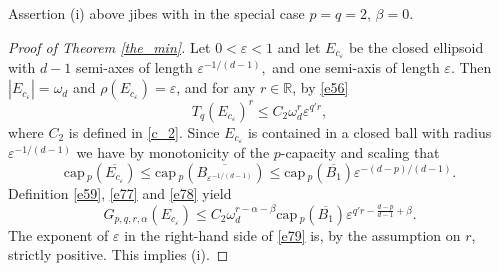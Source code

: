 \documentclass[a4paper,9pt]{article}
\newcommand{\R}{\mathbb{R}}
\def\cp{\mathrm{cap}\,}
\begin{document}
\smallskip

Assertion (i) above jibes with \cite[Theorem 3(i)]{MB} in the special case $p=q=2,\,\beta=0$.


\begin{proof}[Proof of Theorem \ref{the_min}]
Let $0<\varepsilon<1$ and let $E_{c_\varepsilon}$ be the closed ellipsoid with $d-1$ semi-axes of length $\varepsilon^{-1/(d-1)},$ and one semi-axis of length $\varepsilon$.
Then $|E_{c_\varepsilon}|=\omega_d$ and $\rho(E_{c_\varepsilon})=\varepsilon$, and for any $r \in \R$, by \eqref{e56}
\begin{equation}\label{e77}
T_q(E_{c_\varepsilon})^r
\le C_2\omega_d^r\varepsilon^{q'r},
\end{equation}
where $C_2$ is defined in \eqref{c_2}.
Since $E_{c_\varepsilon}$ is contained in a closed ball with radius $\varepsilon^{-1/(d-1)}$ we have by monotonicity of the $p$-capacity and scaling that
\begin{equation}\label{e78}
\cp_p(\overline{E_{c_\varepsilon}})\le \cp_p(\overline{B_{\varepsilon^{-1/(d-1)}}})\le \cp_p(\overline{B_1})\varepsilon^{-(d-p)/(d-1)}.
\end{equation}
Definition \eqref{e59}, \eqref{e77} and \eqref{e78} yield
\begin{equation}\label{e79}
G_{p,q,r,\alpha}(E_{c_\varepsilon})\le C_2 \omega_d^{r-\alpha-\beta}\cp_p(\overline{B_1})\varepsilon^{q'r-\frac{d-p}{d-1}+\beta}.
\end{equation}
The exponent of $\varepsilon$ in the right-hand side of \eqref{e79} is, by the assumption on $r$, strictly positive. This implies (i).

\smallskip



\end{proof}
\end{document}
